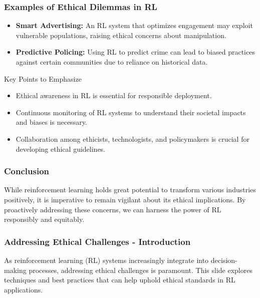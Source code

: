 \documentclass[aspectratio=169]{beamer}
\begin{document}
\begin{frame}[fragile]
    \frametitle{Examples of Ethical Dilemmas in RL}
    \begin{itemize}
        \item \textbf{Smart Advertising:} An RL system that optimizes engagement may exploit vulnerable populations, raising ethical concerns about manipulation.
        \item \textbf{Predictive Policing:} Using RL to predict crime can lead to biased practices against certain communities due to reliance on historical data.
    \end{itemize}

    \begin{block}{Key Points to Emphasize}
        \begin{itemize}
            \item Ethical awareness in RL is essential for responsible deployment.
            \item Continuous monitoring of RL systems to understand their societal impacts and biases is necessary.
            \item Collaboration among ethicists, technologists, and policymakers is crucial for developing ethical guidelines.
        \end{itemize}
    \end{block}
\end{frame}

\begin{frame}[fragile]
    \frametitle{Conclusion}
    While reinforcement learning holds great potential to transform various industries positively, it is imperative to remain vigilant about its ethical implications. By proactively addressing these concerns, we can harness the power of RL responsibly and equitably.
\end{frame}

\begin{frame}[fragile]
    \frametitle{Addressing Ethical Challenges - Introduction}
    As reinforcement learning (RL) systems increasingly integrate into decision-making processes, addressing ethical challenges is paramount. This slide explores techniques and best practices that can help uphold ethical standards in RL applications.
\end{frame}
\end{document}
